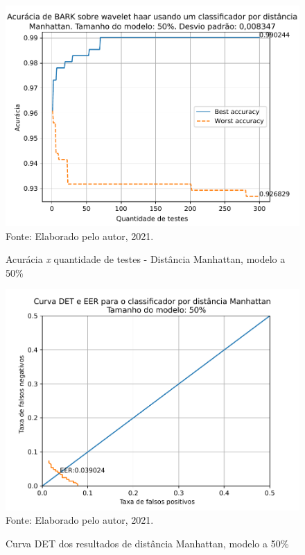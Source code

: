 			\begin{figure}[H]
				\centering
				\caption{Acurácia \textit{x} quantidade de testes - Distância Manhattan, modelo a 50\%}
				\includegraphics[width=.9\linewidth]{images/results/confusionMatrices/classifier_Manhattan_50}
				\label{fig:classifiermanhattan50}
				\\Fonte: Elaborado pelo autor, 2021.
			\end{figure}
	
			\begin{figure}[H]
				\centering
				\caption{Curva DET dos resultados de distância Manhattan, modelo a 50\%}
				\includegraphics[width=.9\linewidth]{images/results/det/DET_for_classifier_Manhattan_50}
				\label{fig:detforclassifiermanhattan50}
				\\Fonte: Elaborado pelo autor, 2021.
			\end{figure}

